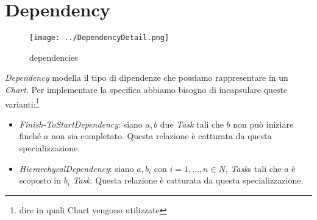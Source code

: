 \section{Dependency}
\label{sec:dependency}

\begin{figure}[h!] 
	\centering
	\texttt{[image: ../DependencyDetail.png]}
	\caption{dependencies}
	\label{fig:dependencies} 
\end{figure}

\emph{Dependency} modella il tipo di dipendenze che possiamo rappresentare in
un \emph{Chart}. Per implementare la specifica abbiamo bisogno di incapsulare
queste varianti:\footnote{dire in quali Chart vengono utilizzate}
\begin{itemize}
  \item \emph{Finish-ToStartDependency}: siano $a, b$ due \emph{Task} tali
  che $b$ non pu\`o iniziare finch\'e $a$ non sia completato. Questa relazione
  \`e catturata da questa specializzazione.
  \item \emph{HierarchycalDependency}: siano $a, b_{i}$ con $i= 1,\ldots,n \in
  N$, \emph{Task}s tali che $a$ \`e scoposto in $b_{i}$ \emph{Task}. Questa
  relazione \`e catturata da questa specializzazione.
\end{itemize}